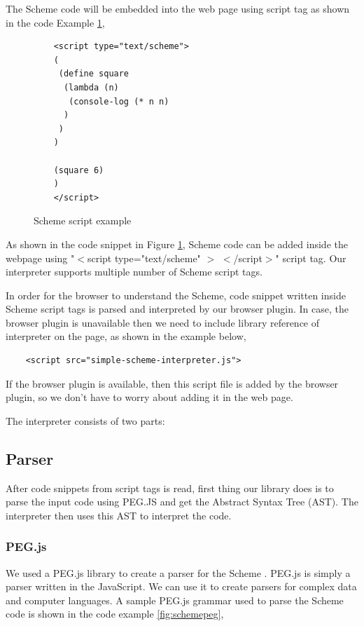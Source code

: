 The Scheme code will be embedded into the web page using script tag as shown in the code Example \ref{fig:schemescript}, 

\begin{figure}[h]
	\begin{lstlisting} 
	<script type="text/scheme">
	(
	 (define square
	  (lambda (n) 
	   (console-log (* n n)
	  ) 
	 )
	)
		
	(square 6)
	)
	</script>
	\end{lstlisting}
	\caption{Scheme script example}
	\label{fig:schemescript}
\end{figure}



As shown in the code snippet in Figure \ref{fig:schemescript}, Scheme code can be added inside the webpage using "$<$script type="text/scheme" $>$ $<$/script$>$" script tag. Our interpreter supports multiple number of Scheme script tags.

In order for the browser to understand the Scheme, code snippet written inside Scheme script tags is parsed and interpreted by our browser plugin. In case, the browser plugin is unavailable then we need to include library reference of interpreter on the page, as shown in the example below, 

\begin{lstlisting}
	<script src="simple-scheme-interpreter.js">
\end{lstlisting}

If the browser plugin is available, then this script file is added by the browser plugin, so we don't have to worry about adding it in the web page.

The interpreter consists of two parts:

\subsection{Parser}

After code snippets from script tags is read, first thing our library does is to parse the input code using PEG.JS and get the Abstract Syntax Tree (AST). The interpreter then uses this AST to interpret the code.

\subsubsection{PEG.js}

We used a PEG.js library to create a parser for the Scheme \cite{pegjs}. PEG.js is simply a parser written in the JavaScript. We can use it to create parsers for complex data and computer languages. A sample PEG.js grammar used to parse the Scheme code is shown in the code example \ref{fig:schemepeg},


